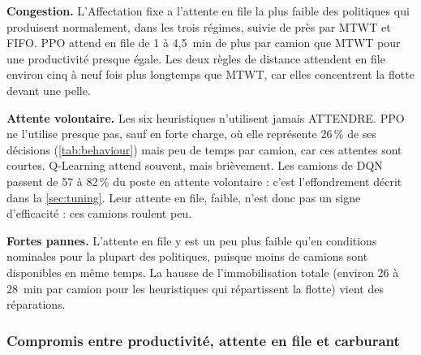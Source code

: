 \documentclass[11pt,a4paper]{article}
\newif\ifrevmarks
\newcommand{\revtag}[1]{\ifrevmarks\textsuperscript{\textcolor{red!70!black}{\scriptsize[#1]}}\fi}
\newenvironment{revbloc}[1]{\par\ifrevmarks\color{revcolor}\noindent\revtag{#1}\ \fi}{\par}
\newif\ifcorrmarks
\newcommand{\corr}[1]{\ifcorrmarks\textcolor{corrcolor}{#1}\else#1\fi}
\begin{document}
\begin{revbloc}{T31}
\textbf{Congestion.} L'Affectation fixe a l'attente en file la plus faible des politiques qui produisent normalement, dans les trois régimes, suivie de près par MTWT et FIFO. PPO attend en file \corr{de 1 à 4,5~min de plus par camion que MTWT} pour une productivité presque égale. Les deux règles de distance \corr{attendent en file environ cinq à neuf fois plus longtemps que MTWT}, car elles concentrent la flotte devant une pelle.

\textbf{Attente volontaire.} Les six heuristiques n'utilisent jamais ATTENDRE. PPO ne l'utilise presque pas, sauf en forte charge, où elle représente 26\,\% de ses décisions \corr{(\cref{tab:behaviour}) mais peu de temps par camion}, car ces attentes sont courtes. \corr{Q-Learning attend souvent, mais brièvement. Les camions de DQN passent de 57 à 82\,\% du poste en attente volontaire :} c'est l'effondrement décrit dans la \cref{sec:tuning}. Leur attente en file, faible, n'est donc pas un signe d'efficacité : ces camions roulent peu.

\textbf{Fortes pannes.} L'attente en file y est un peu plus faible qu'en conditions nominales pour la plupart des politiques, puisque moins de camions sont disponibles en même temps. La hausse de l'immobilisation totale (environ 26 à 28~min par camion pour les heuristiques qui répartissent la flotte) vient des réparations.
\end{revbloc}


\subsubsection{Compromis entre productivité, attente en file et carburant}
\label{sec:pareto}
\end{document}
